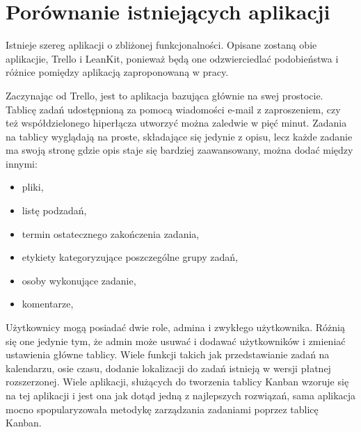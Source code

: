 \section{Porównanie istniejących aplikacji}
\indent Istnieje szereg aplikacji o zbliżonej funkcjonalności. Opisane zostaną obie aplikacjie, Trello i LeanKit, ponieważ będą one odzwierciedlać  podobieństwa i różnice pomiędzy aplikacją zaproponowaną w pracy. 

\indent  Zaczynając od Trello, jest to aplikacja bazująca głównie na swej prostocie. Tablicę zadań udostępnioną za pomocą wiadomości e-mail z zaproszeniem, czy też współdzielonego hiperłącza  utworzyć można zaledwie w pięć minut. Zadania na tablicy wyglądają na proste, składające się jedynie z opisu, lecz każde zadanie ma swoją stronę gdzie opis staje się bardziej zaawansowany, można dodać między innymi:
\begin{itemize}
	\item pliki, 
	\item listę podzadań,
	\item termin ostatecznego zakończenia zadania,
	\item etykiety kategoryzujące poszczególne grupy zadań,
	\item osoby wykonujące zadanie,
	\item komentarze,
\end{itemize}
Użytkownicy mogą posiadać dwie role,  admina i zwykłego użytkownika. Różnią się one jedynie tym, że admin może usuwać i dodawać użytkowników i zmieniać ustawienia główne tablicy. Wiele funkcji takich jak przedstawianie zadań na kalendarzu, osie czasu, dodanie lokalizacji do zadań istnieją w wersji płatnej rozszerzonej.
Wiele aplikacji, służących do tworzenia tablicy Kanban wzoruje się na tej aplikacji i jest ona jak dotąd jedną z najlepszych rozwiązań, sama aplikacja mocno spopularyzowała metodykę zarządzania zadaniami poprzez tablicę Kanban.


